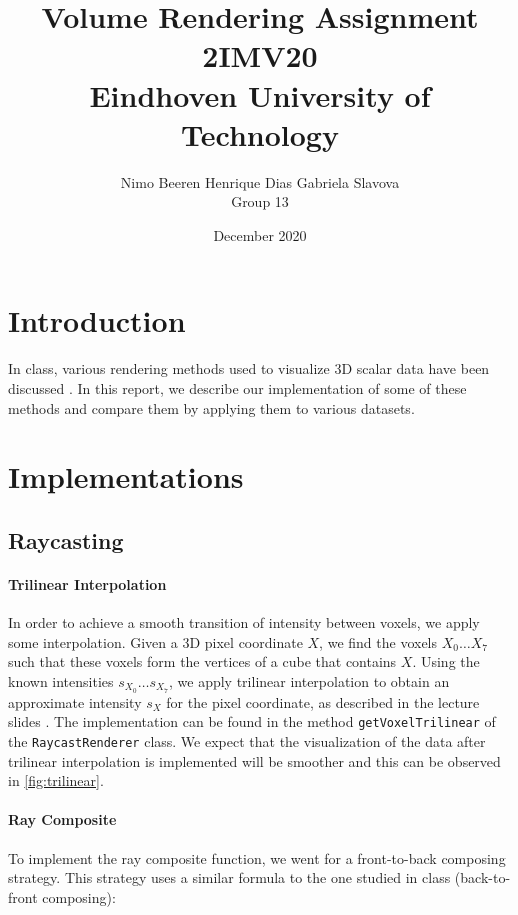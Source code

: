 \documentclass[a4paper]{article}
\title{Volume Rendering Assignment\\2IMV20\\Eindhoven University of Technology}
\author{Nimo Beeren \quad Henrique Dias \quad Gabriela Slavova\\Group 13}
\date{December 2020}
\begin{document}
\maketitle

\section{Introduction}

In class, various rendering methods used to visualize 3D scalar data have been discussed \citep{2imv20_2}. In this report, we describe our implementation of some of these methods and compare them by applying them to various datasets.

\section{Implementations}

\subsection{Raycasting}

\paragraph{Trilinear Interpolation}
\label{trilinear_interpolation}

In order to achieve a smooth transition of intensity between voxels, we apply some interpolation. Given a 3D pixel coordinate $X$, we find the voxels $X_0 \ldots X_7$ such that these voxels form the vertices of a cube that contains $X$. Using the known intensities $s_{X_0}\ldots s_{X_7}$, we apply trilinear interpolation to obtain an approximate intensity $s_X$ for the pixel coordinate, as described in the lecture slides \citep{2imv20_2}. The implementation can be found in the method {\tt getVoxelTrilinear} of the {\tt RaycastRenderer} class. We expect that the visualization of the data after trilinear interpolation is implemented will be smoother and this can be observed in \autoref{fig:trilinear}.

\paragraph{Ray Composite}
\label{ray_composite}

To implement the ray composite function, we went for a front-to-back composing strategy. This strategy uses a similar formula to the one studied in class (back-to-front composing):
\end{document}
